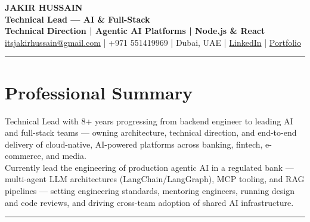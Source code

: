 \documentclass[10pt,a4paper]{article}
\newcommand{\NameSize}{\fontsize{22}{24}\selectfont}
\newcommand{\TitleSize}{\fontsize{10.8}{13}\selectfont}
\newcommand{\TagSize}{\fontsize{10}{12}\selectfont}
\newcommand{\BodySize}{\fontsize{9.7}{12}\selectfont}
\newcommand{\SmallBody}{\fontsize{9.2}{11.4}\selectfont}
\newcommand{\topdivider}{\color{rulecolor}\rule{\linewidth}{0.5pt}\color{primary}\vspace{0pt}}
\newcommand{\ATSspaceoff}{\ifdefined\pdfinterwordspaceoff\pdfinterwordspaceoff\fi}
\newcommand{\ATSspaceon}{\ifdefined\pdfinterwordspaceon\pdfinterwordspaceon\fi}
\begin{document}
\BodySize

\begin{center}

{\ATSspaceoff\NameSize \bfseries JAKIR HUSSAIN\ATSspaceon}\\[4pt]
{\TitleSize \bfseries Technical Lead --- AI \& Full-Stack}\\[2pt]
{\TagSize \bfseries Technical Direction \;|\; Agentic AI Platforms \;|\; Node.js \& React}\\[6pt]

\href{mailto:itsjakirhussain@gmail.com}{itsjakirhussain@gmail.com} \;|\;
+971 551419969 \;|\;
Dubai, UAE \;|\;
\href{https://linkedin.com/in/iam-hussain}{LinkedIn} \;|\;
\href{https://iam-hussain.site}{Portfolio}

\end{center}
\vspace{-8pt}
\topdivider
\vspace{2pt}
\section*{Professional Summary}
\SmallBody
Technical Lead with 8+ years progressing from backend engineer to leading AI and full-stack teams — owning architecture, technical direction, and end-to-end delivery of cloud-native, AI-powered platforms across banking, fintech, e-commerce, and media.\\[5pt]

Currently lead the engineering of production agentic AI in a regulated bank — multi-agent LLM architectures (LangChain/LangGraph), MCP tooling, and RAG pipelines — setting engineering standards, mentoring engineers, running design and code reviews, and driving cross-team adoption of shared AI infrastructure.\\[8pt]

\vspace{-8pt}
\topdivider
\vspace{2pt}
\end{document}
